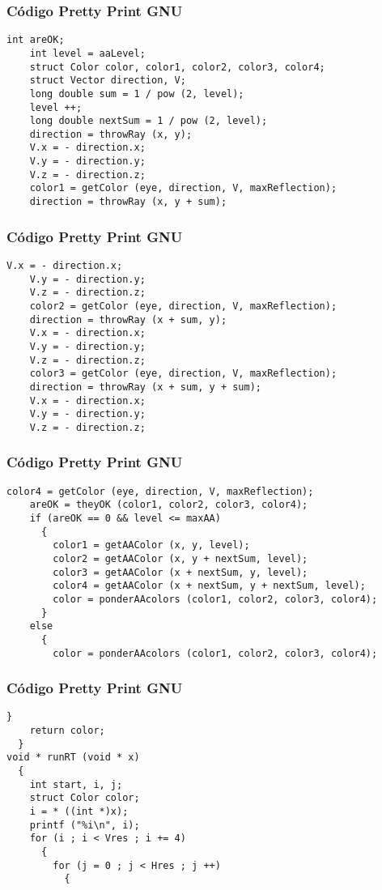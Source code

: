 \documentclass{beamer}
\begin{document}
\begin{frame}[fragile]
\frametitle{C\'odigo Pretty Print GNU}
\begin{lstlisting}[style=CStyle]
    int areOK;
    int level = aaLevel;
    struct Color color, color1, color2, color3, color4;
    struct Vector direction, V;
    long double sum = 1 / pow (2, level);
    level ++;
    long double nextSum = 1 / pow (2, level);
    direction = throwRay (x, y);
    V.x = - direction.x;
    V.y = - direction.y;
    V.z = - direction.z;
    color1 = getColor (eye, direction, V, maxReflection);
    direction = throwRay (x, y + sum);
\end{lstlisting}
\end{frame}
\begin{frame}[fragile]
\frametitle{C\'odigo Pretty Print GNU}
\begin{lstlisting}[style=CStyle]
    V.x = - direction.x;
    V.y = - direction.y;
    V.z = - direction.z;
    color2 = getColor (eye, direction, V, maxReflection);
    direction = throwRay (x + sum, y);
    V.x = - direction.x;
    V.y = - direction.y;
    V.z = - direction.z;
    color3 = getColor (eye, direction, V, maxReflection);
    direction = throwRay (x + sum, y + sum);
    V.x = - direction.x;
    V.y = - direction.y;
    V.z = - direction.z;
\end{lstlisting}
\end{frame}
\begin{frame}[fragile]
\frametitle{C\'odigo Pretty Print GNU}
\begin{lstlisting}[style=CStyle]
    color4 = getColor (eye, direction, V, maxReflection);
    areOK = theyOK (color1, color2, color3, color4);
    if (areOK == 0 && level <= maxAA)
      {
        color1 = getAAColor (x, y, level);
        color2 = getAAColor (x, y + nextSum, level);
        color3 = getAAColor (x + nextSum, y, level);
        color4 = getAAColor (x + nextSum, y + nextSum, level);
        color = ponderAAcolors (color1, color2, color3, color4);
      }
    else
      {
        color = ponderAAcolors (color1, color2, color3, color4);
\end{lstlisting}
\end{frame}
\begin{frame}[fragile]
\frametitle{C\'odigo Pretty Print GNU}
\begin{lstlisting}[style=CStyle]
      }
    return color;
  }
void * runRT (void * x)
  {
    int start, i, j;
    struct Color color;
    i = * ((int *)x);
    printf ("%i\n", i);
    for (i ; i < Vres ; i += 4)
      {
        for (j = 0 ; j < Hres ; j ++)
          {
            \end{lstlisting}
\end{frame}
\end{document}

